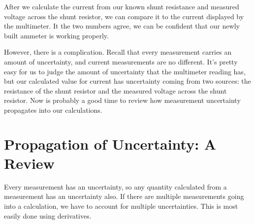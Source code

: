 After we calculate the current from our known shunt resistance and
measured voltage across the shunt resistor, we can compare it to the current
displayed by the multimeter. It the two numbers agree, we can be confident
that our newly built ammeter is working properly.

However, there is a complication. Recall that every measurement carries an
amount of uncertainty, and current measurements are no different. It's 
pretty easy for us to judge the amount of uncertainty that the multimeter 
reading has, but our calculated value for current has uncertainty coming from
two sources: the resistance of the shunt resistor and the measured voltage
across the shunt resistor. Now is probably a good time to review how 
measurement uncertainty propagates into our calculations.

\section{Propagation of Uncertainty: A Review}

Every measurement has an uncertainty, so any quantity calculated from a 
measurement has an uncertainty also. If there are multiple measurements going
into a calculation, we have to account for multiple uncertainties. This is 
most easily done using derivatives.

